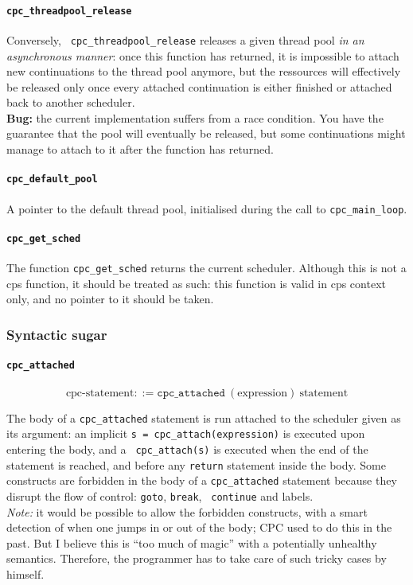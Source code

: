 \documentclass[a4paper]{report}
\begin{document}
\paragraph{\tt cpc\_threadpool\_release} Conversely, {\tt
cpc\_threadpool\_release} releases a given thread pool {\em in an
asynchronous manner\/}: once this function has returned, it is
impossible to attach new continuations to the thread pool anymore, but
the ressources will effectively be released only once every attached
continuation is either finished or attached back to another scheduler.\\
{\bf Bug:} the current implementation suffers from a race condition.
You have the guarantee that the pool will eventually be released, but
some continuations might manage to attach to it after the function has
returned.

\paragraph{\tt cpc\_default\_pool} A pointer to the default thread pool,
initialised during the call to {\tt cpc\_main\_loop}.

\paragraph{\tt cpc\_get\_sched} The function {\tt cpc\_get\_sched} returns
the current scheduler.  Although this is not a cps function, it should
be treated as such: this function is valid in cps context only, and no
pointer to it should be taken.

\subsubsection*{Syntactic sugar}
\paragraph{\tt cpc\_attached}
\[ \mbox{cpc-statement} ::=
   \mathtt{cpc\_attached}\ (\mbox{expression})\ \mbox{statement} \]

The body of a {\tt cpc\_attached} statement is run attached to the
scheduler given as its argument: an implicit {\tt s =
cpc\_attach(expression)} is executed upon entering the body, and a {\tt
cpc\_attach(s)} is executed when the end of the statement is reached,
and before any {\tt return} statement inside the body.  Some constructs
are forbidden in the body of a {\tt cpc\_attached} statement because
they disrupt the flow of control: {\tt goto}, {\tt break}, {\tt
continue} and labels.\\
{\em Note:\/} it would be possible to allow the forbidden constructs,
with a smart detection of when one jumps in or out of the body; CPC used
to do this in the past.  But I believe this is ``too much of magic''
with a potentially unhealthy semantics.  Therefore, the programmer has
to take care of such tricky cases by himself.
\end{document}
